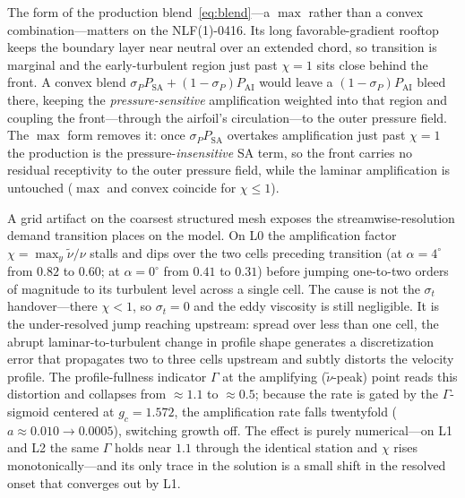 \documentclass[journal]{new-aiaa}
\begin{document}
The form of the production blend~\eqref{eq:blend}---a $\max$ rather than a convex
combination---matters on the NLF(1)-0416. Its long favorable-gradient rooftop
keeps the boundary layer near neutral over an extended chord, so transition is
marginal and the early-turbulent region just past $\chi\!=\!1$ sits close behind
the front. A convex blend $\sigma_P P_\mathrm{SA}+(1-\sigma_P)P_\mathrm{AI}$
would leave a $(1-\sigma_P)P_\mathrm{AI}$ bleed there, keeping the
\emph{pressure-sensitive} amplification weighted into that region and coupling the
front---through the airfoil's circulation---to the outer pressure field. The
$\max$ form removes it: once $\sigma_P P_\mathrm{SA}$ overtakes amplification just
past $\chi\!=\!1$ the production is the pressure-\emph{insensitive} SA term, so the
front carries no residual receptivity to the outer pressure field, while the
laminar amplification is untouched ($\max$ and convex coincide for
$\chi\!\le\!1$).

A grid artifact on the coarsest structured mesh exposes the streamwise-resolution
demand transition places on the model. On L0 the
amplification factor $\chi\!=\!\max_y\tilde\nu/\nu$
stalls and dips over the two cells preceding transition (at $\alpha\!=\!4^\circ$
from $0.82$ to $0.60$; at $\alpha\!=\!0^\circ$ from $0.41$ to $0.31$) before jumping
one-to-two orders of magnitude to its turbulent level across a single cell. The
cause is not the $\sigma_t$ handover---there $\chi\!<\!1$, so $\sigma_t\!=\!0$ and
the eddy viscosity is still negligible. It is the under-resolved jump reaching
upstream: spread over less than one cell, the abrupt laminar-to-turbulent change in
profile shape generates a discretization error that propagates two to three cells
upstream and subtly distorts the velocity profile. The profile-fullness indicator
$\Gamma$ at the amplifying ($\tilde\nu$-peak) point reads this distortion and
collapses from $\approx\!1.1$ to $\approx\!0.5$; because the rate is gated by the
$\Gamma$-sigmoid centered at $g_c\!=\!1.572$, the amplification rate falls
twentyfold ($a\!\approx\!0.010\!\to\!0.0005$), switching growth off. The effect is
purely numerical---on L1 and L2 the same $\Gamma$ holds near $1.1$ through the
identical station and $\chi$ rises monotonically---and its only trace in the
solution is a small shift in the resolved onset that converges out by L1.
\end{document}
